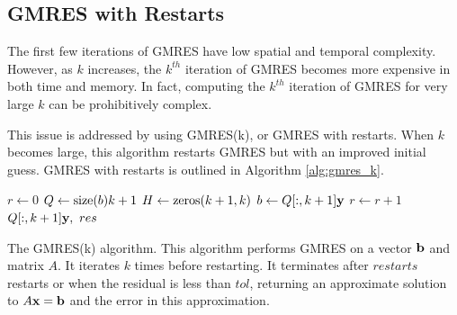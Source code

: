 \subsection*{GMRES with Restarts}
The first few iterations of GMRES have low spatial and temporal complexity. 
However, as $k$ increases, the $k^{th}$ iteration of GMRES becomes more expensive in both time and memory.
In fact, computing the $k^{th}$ iteration of GMRES for very large $k$ can be prohibitively complex.

This issue is addressed by using GMRES(k), or GMRES with restarts.
When $k$ becomes large, this algorithm restarts GMRES but with an improved initial guess.
GMRES with restarts is outlined in Algorithm \ref{alg:gmres_k}.


\begin{algorithm}
\begin{algorithmic}[1]
  \State $r \gets 0$ 
  \State $Q \gets \empty{\size{b}}{k+1}$			
\State $H \gets \zeros{k+1}{ k}$
    \State $b \gets Q[:,k+1]{\bf y}$
    \State $r \gets r+1$
    \EndWhile
    \State {} $Q[:,k+1]{\bf y}, \,\, res$		
\EndProcedure
\end{algorithmic}
\caption{The GMRES(k) algorithm. This algorithm performs GMRES on a vector ${\bf b}$ and matrix $A$. It iterates $k$ times before restarting. 
It terminates after $restarts$ restarts or when the residual is less than $tol$, returning an approximate solution to $A{\bf x}={\bf b}$ and the error in this approximation. }
\label{alg:gmres_k}
\end{algorithm}





